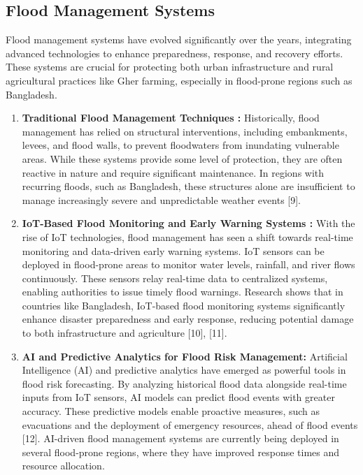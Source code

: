 \documentclass[conference]{IEEEtran}
\begin{document}
\subsection{ \textbf{Flood Management Systems}}
Flood management systems have evolved significantly over the years, integrating advanced technologies to enhance preparedness, response, and recovery efforts. These systems are crucial for protecting both urban infrastructure and rural agricultural practices like Gher farming, especially in flood-prone regions such as Bangladesh.
\begin{enumerate}

\item \textbf{ Traditional Flood Management Techniques :}
Historically, flood management has relied on structural interventions, including embankments, levees, and flood walls, to prevent floodwaters from inundating vulnerable areas. While these systems provide some level of protection, they are often reactive in nature and require significant maintenance. In regions with recurring floods, such as Bangladesh, these structures alone are insufficient to manage increasingly severe and unpredictable weather events [9].

\item \textbf{ IoT-Based Flood Monitoring and Early Warning Systems : }
With the rise of IoT technologies, flood management has seen a shift towards real-time monitoring and data-driven early warning systems. IoT sensors can be deployed in flood-prone areas to monitor water levels, rainfall, and river flows continuously. These sensors relay real-time data to centralized systems, enabling authorities to issue timely flood warnings. Research shows that in countries like Bangladesh, IoT-based flood monitoring systems significantly enhance disaster preparedness and early response, reducing potential damage to both infrastructure and agriculture [10], [11].

\item \textbf{AI and Predictive Analytics for Flood Risk Management: }
Artificial Intelligence (AI) and predictive analytics have emerged as powerful tools in flood risk forecasting. By analyzing historical flood data alongside real-time inputs from IoT sensors, AI models can predict flood events with greater accuracy. These predictive models enable proactive measures, such as evacuations and the deployment of emergency resources, ahead of flood events [12]. AI-driven flood management systems are currently being deployed in several flood-prone regions, where they have improved response times and resource allocation.


\end{enumerate}
\end{document}
